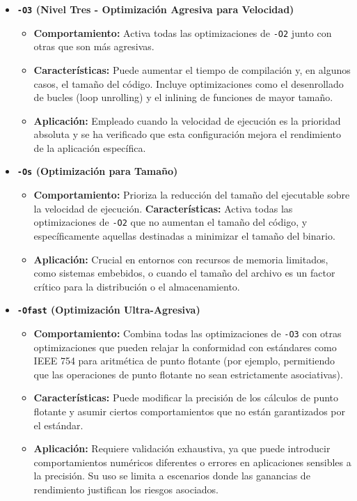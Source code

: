 \documentclass{article}
\begin{document}
\begin{itemize}[leftmargin=*,noitemsep,topsep=0pt]
		\item \textbf{\texttt{-O3} (Nivel Tres - Optimización Agresiva para Velocidad)}
		\begin{itemize}[leftmargin=*,noitemsep,topsep=0pt]
			\item \textbf{Comportamiento:} Activa todas las optimizaciones de \texttt{-O2} junto con otras que son más agresivas.
			\item \textbf{Características:} Puede aumentar el tiempo de compilación y, en algunos casos, el tamaño del código. Incluye optimizaciones como el desenrollado de bucles (loop unrolling) y el inlining de funciones de mayor tamaño.
			\item \textbf{Aplicación:} Empleado cuando la velocidad de ejecución es la prioridad absoluta y se ha verificado que esta configuración mejora el rendimiento de la aplicación específica.
		\end{itemize}
		
		\item \textbf{\texttt{-Os} (Optimización para Tamaño)}
		\begin{itemize}[leftmargin=*,noitemsep,topsep=0pt]
			\item \textbf{Comportamiento:} Prioriza la reducción del tamaño del ejecutable sobre la velocidad de ejecución.
			\textbf{Características:} Activa todas las optimizaciones de \texttt{-O2} que no aumentan el tamaño del código, y específicamente aquellas destinadas a minimizar el tamaño del binario.
			\item \textbf{Aplicación:} Crucial en entornos con recursos de memoria limitados, como sistemas embebidos, o cuando el tamaño del archivo es un factor crítico para la distribución o el almacenamiento.
		\end{itemize}
		
		\item \textbf{\texttt{-Ofast} (Optimización Ultra-Agresiva)}
		\begin{itemize}[leftmargin=*,noitemsep,topsep=0pt]
			\item \textbf{Comportamiento:} Combina todas las optimizaciones de \texttt{-O3} con otras optimizaciones que pueden relajar la conformidad con estándares como IEEE 754 para aritmética de punto flotante (por ejemplo, permitiendo que las operaciones de punto flotante no sean estrictamente asociativas).
			\item \textbf{Características:} Puede modificar la precisión de los cálculos de punto flotante y asumir ciertos comportamientos que no están garantizados por el estándar.
			\item \textbf{Aplicación:} Requiere validación exhaustiva, ya que puede introducir comportamientos numéricos diferentes o errores en aplicaciones sensibles a la precisión. Su uso se limita a escenarios donde las ganancias de rendimiento justifican los riesgos asociados.
		\end{itemize}
		

\end{itemize}
\end{document}
